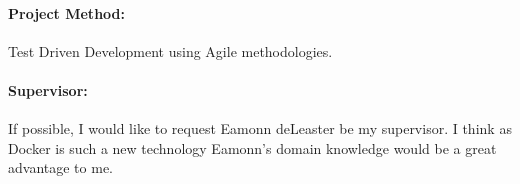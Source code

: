 \documentclass{article}
\begin{document}
\paragraph{Project Method:}
\label{par:Project Method}
Test Driven Development using Agile methodologies.

\paragraph{Supervisor:}
\label{par:Supervisor}
If possible, I would like to request Eamonn deLeaster be my supervisor. I think as Docker is such a new technology Eamonn's domain knowledge would be a great advantage to me.
\end{document}

